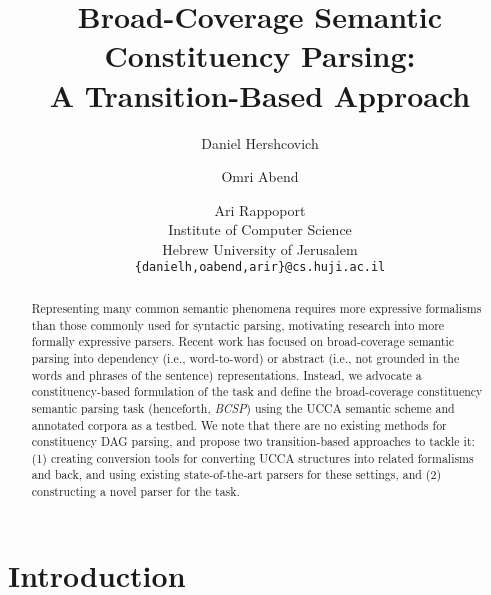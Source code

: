 \documentclass[11pt]{article}
\title{Broad-Coverage Semantic Constituency Parsing: \\
A Transition-Based Approach}
\author{Daniel Hershcovich \and Omri Abend \and Ari Rappoport \\
  Institute of Computer Science \\
  Hebrew University of Jerusalem \\
  {\tt \{danielh,oabend,arir\}@cs.huji.ac.il}
}
\date{}
\begin{document}
\maketitle

\begin{abstract}

  Representing many common semantic phenomena requires more expressive formalisms
  than those commonly used for syntactic parsing, motivating research into
  more formally expressive parsers.
  Recent work has focused on broad-coverage semantic parsing into dependency
  (i.e., word-to-word) or abstract (i.e., not grounded in the words and phrases of
  the sentence) representations.
  Instead, we advocate a constituency-based formulation of the
  task and define the broad-coverage constituency semantic parsing task
  (henceforth, {\it BCSP}) using the UCCA semantic scheme and annotated corpora as a testbed.
  We note that there are no existing methods for constituency DAG parsing,
  and propose two transition-based approaches to tackle it:
  (1) creating conversion tools for converting UCCA structures into related
  formalisms and back, and using existing state-of-the-art parsers for
  these settings, and (2) constructing a novel parser for the task.
  
  
\end{abstract}



\section{Introduction}

\end{document}

